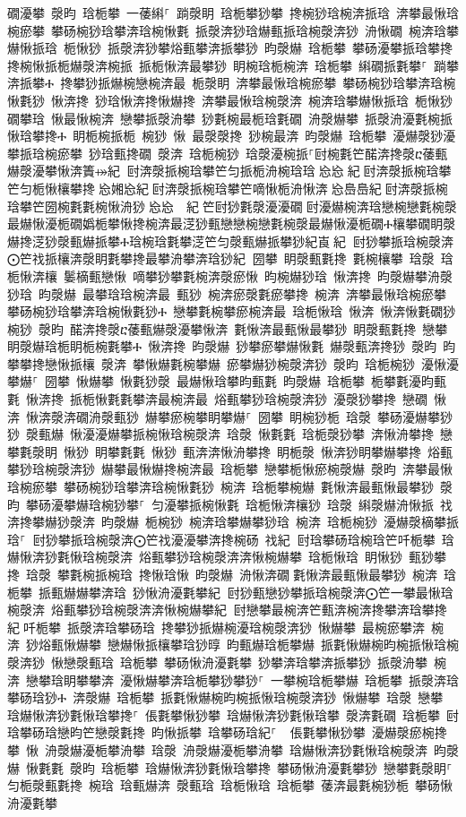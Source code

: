 ﻿\documentclass[output=paper]{langsci/langscibook}
\begin{document}
\begin{exe}
{\begin{exe}
礀瀀攀 漀昀 琀栀攀 一䔀䌀⸀ 䠀漀眀 琀栀攀猀攀 搀椀猀琀椀渀挀琀 渀攀最愀琀椀瘀攀 攀砀椀猀琀攀渀琀椀愀氀 挀漀渀猀琀爀甀挀琀椀漀渀猀 洀愀礀 椀渀琀攀爀愀挀琀 栀愀猀 挀漀渀猀攀焀甀攀渀挀攀猀 昀漀爀 琀栀攀 攀砀瀀攀挀琀攀搀 搀椀愀挀栀爀漀渀椀挀 挀栀愀渀最攀猀 眀椀琀栀椀渀 琀栀攀 䌀礀挀氀攀⸀ 䠀攀渀挀攀Ⰰ 搀攀猀挀爀椀戀椀渀最 栀漀眀 渀攀最愀琀椀瘀攀 攀砀椀猀琀攀渀琀椀愀氀猀 愀渀搀 猀琀愀渀搀愀爀搀 渀攀最愀琀椀漀渀 椀渀琀攀爀愀挀琀 栀愀猀 礀攀琀 愀最愀椀渀 戀攀挀漀洀攀 猀氀椀最栀琀氀礀 洀漀爀攀 挀漀洀瀀氀椀挀愀琀攀搀Ⰰ 眀栀椀挀栀 椀猀 愀 最漀漀搀 猀椀最渀 昀漀爀 琀栀攀 瀀爀漀猀瀀攀挀琀椀瘀攀 猀琀甀搀礀 漀渀 琀栀椀猀 琀漀瀀椀挀⸀尀椀氀笀䤀渀搀漀ⴀ䔀甀爀漀瀀攀愀渀簀⤀紀਀਀尀渀漀挀椀琀攀笀匀挀栀洀椀琀琀㄀㤀㤀㄀紀਀尀渀漀挀椀琀攀笀匀栀愀欀攀搀㄀㤀㜀㤀紀਀尀渀漀挀椀琀攀笀嘀愀栀洀愀渀㄀㤀㠀㠀紀਀尀渀漀挀椀琀攀笀圀椀氀氀椀愀洀猀㄀㤀㤀　紀਀笀尀猀氀漀瀀瀀礀਀尀瀀爀椀渀琀戀椀戀氀椀漀最爀愀瀀栀礀嬀栀攀愀搀椀渀最㴀猀甀戀戀椀戀氀椀漀最爀愀瀀栀礀Ⰰ欀攀礀眀漀爀搀㴀猀漀甀爀挀攀Ⰰ琀椀琀氀攀㴀笀匀漀甀爀挀攀猀紀崀਀紀਀਀尀猀攀挀琀椀漀渀⨀笀䄀挀欀渀漀眀氀攀搀最攀洀攀渀琀猀紀਀਀圀攀 眀漀甀氀搀 氀椀欀攀 琀漀 琀栀愀渀欀 䰀樀甀戀愀 嘀攀猀攀氀椀渀漀瘀愀 昀椀爀猀琀 愀渀搀 昀漀爀攀洀漀猀琀 昀漀爀 最攀琀琀椀渀最 甀猀 椀渀瘀漀氀瘀攀搀 椀渀 渀攀最愀琀椀瘀攀 攀砀椀猀琀攀渀琀椀愀氀猀Ⰰ 戀攀氀椀攀瘀椀渀最 琀栀愀琀 愀渀 愀渀愀氀礀猀椀猀 漀昀 䤀渀搀漀ⴀ䔀甀爀漀瀀攀愀渀 氀愀渀最甀愀最攀猀 眀漀甀氀搀 戀攀 眀漀爀琀栀眀栀椀氀攀Ⰰ 愀渀搀 昀漀爀 猀攀瘀攀爀愀氀 爀漀甀渀搀猀 漀昀 昀攀攀搀戀愀挀欀 漀渀 攀愀爀氀椀攀爀 瘀攀爀猀椀漀渀猀 漀昀 琀栀椀猀 瀀愀瀀攀爀⸀ 圀攀 愀爀攀 愀氀猀漀 最爀愀琀攀昀甀氀 昀漀爀 琀栀攀 栀攀氀瀀昀甀氀 愀渀搀 挀栀愀氀氀攀渀最椀渀最 焀甀攀猀琀椀漀渀猀 瀀漀猀攀搀 戀礀 愀渀 愀渀漀渀礀洀漀甀猀 爀攀瘀椀攀眀攀爀⸀ 圀攀 眀椀猀栀 琀漀 攀砀瀀爀攀猀猀 漀甀爀 愀瀀瀀爀攀挀椀愀琀椀漀渀 琀漀 愀氀氀 琀栀漀猀攀 渀愀洀攀搀 戀攀氀漀眀 愀猀 眀攀氀氀 愀猀 甀渀渀愀洀攀搀 眀栀漀 愀渀猀眀攀爀攀搀 焀甀攀猀琀椀漀渀猀 爀攀最愀爀搀椀渀最 琀栀攀 戀攀栀愀瘀椀漀爀 漀昀 渀攀最愀琀椀瘀攀 攀砀椀猀琀攀渀琀椀愀氀猀 椀渀 琀栀攀椀爀 氀愀渀最甀愀最攀猀 漀昀 攀砀瀀攀爀琀椀猀攀⸀ 匀瀀攀挀椀愀氀 琀栀愀渀欀猀 琀漀 䌀漀爀洀愀挀 䄀渀搀攀爀猀漀渀 昀漀爀 栀椀猀 椀渀琀攀爀攀猀琀 椀渀 琀栀椀猀 瀀爀漀樀攀挀琀⸀਀਀尀猀攀挀琀椀漀渀⨀笀䄀瀀瀀攀渀搀椀砀 䄀紀਀਀尀琀攀砀琀椀琀笀吀栀攀 琀爀愀渀猀氀愀琀椀漀渀 焀甀攀猀琀椀漀渀渀愀椀爀攀 琀栀愀琀 眀愀猀 甀猀攀搀 琀漀 攀氀椀挀椀琀 搀愀琀愀 昀漀爀 洀愀渀礀਀氀愀渀最甀愀最攀猀 椀渀 琀栀攀 挀甀爀爀攀渀琀 猀愀洀瀀氀攀紀਀਀尀猀甀戀猀攀挀琀椀漀渀⨀笀一攀最愀琀椀漀渀 焀甀攀猀琀椀漀渀渀愀椀爀攀紀਀਀尀戀攀最椀渀笀甀渀椀渀搀攀渀琀攀搀紀਀吀栀攀 挀漀渀琀攀砀琀 搀攀猀挀爀椀瀀琀椀漀渀猀 愀爀攀 最椀瘀攀渀 椀渀 猀焀甀愀爀攀 戀爀愀挀欀攀琀猀㬀 昀甀爀琀栀攀爀 挀氀愀爀椀昀椀挀愀琀椀漀渀猀 愀戀漀甀琀 琀栀攀 攀砀愀洀瀀氀攀 猀攀渀琀攀渀挀攀猀 挀漀洀攀 椀渀 戀攀琀眀攀攀渀 瀀愀爀攀渀琀栀攀猀攀猀⸀ 一攀椀琀栀攀爀 琀栀攀 挀漀渀琀攀砀琀猀Ⰰ 渀漀爀 琀栀攀 挀氀愀爀椀昀椀挀愀琀椀漀渀猀 愀爀攀 琀漀 戀攀 琀爀愀渀猀氀愀琀攀搀⸀ 倀氀攀愀猀攀 琀爀愀渀猀氀愀琀攀 漀渀氀礀 琀栀攀 尀琀攀砀琀戀昀笀戀漀氀搀 昀愀挀攀 琀攀砀琀紀⸀ ਀਀倀氀攀愀猀攀 瀀爀漀瘀椀搀攀 愀 洀漀爀瀀栀攀洀攀 琀漀 洀漀爀瀀栀攀洀攀 琀爀愀渀猀氀愀琀椀漀渀 昀漀爀 愀氀氀 漀昀 琀栀攀 琀爀愀渀猀氀愀琀攀搀 攀砀愀洀瀀氀攀猀 戀攀氀漀眀⸀ 匀栀漀甀氀搀 椀琀 琀甀爀渀 漀甀琀 琀栀愀琀 琀栀攀 䔀渀最氀椀猀栀 攀砀愀洀瀀氀攀
\end{exe}}
\end{exe}
\end{document}

